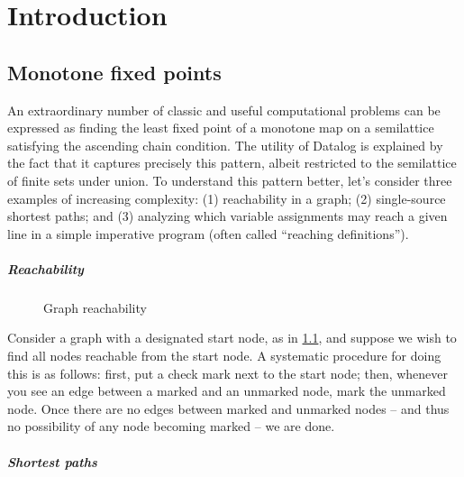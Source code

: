 \chapter{Introduction}


\section{Monotone fixed points}


An extraordinary number of classic and useful computational problems can be
expressed as finding the least fixed point of a monotone map on a semilattice
satisfying the ascending chain condition. The utility of Datalog is explained by
the fact that it captures precisely this pattern, albeit restricted to the
semilattice of finite sets under union. To understand this pattern better, let's
consider three examples of increasing complexity:
%
(1) reachability in a graph;
(2) single-source shortest paths;
and (3) analyzing which variable assignments may reach a given line in a simple
  imperative program (often called ``reaching definitions'').

\paragraph{Reachability}

\begin{figure}[t]
  \XXX
  \caption{Graph reachability}
  \label{figure-reachability}
\end{figure}

Consider a graph with a designated start node, as in \cref{figure-reachability},
and suppose we wish to find all nodes reachable from the start node. A
systematic procedure for doing this is as follows: first, put a check mark next
to the start node; then, whenever you see an edge between a marked and an
unmarked node, mark the unmarked node. Once there are no edges between marked
and unmarked nodes -- and thus no possibility of any node becoming marked -- we
are done.

\paragraph{Shortest paths}

